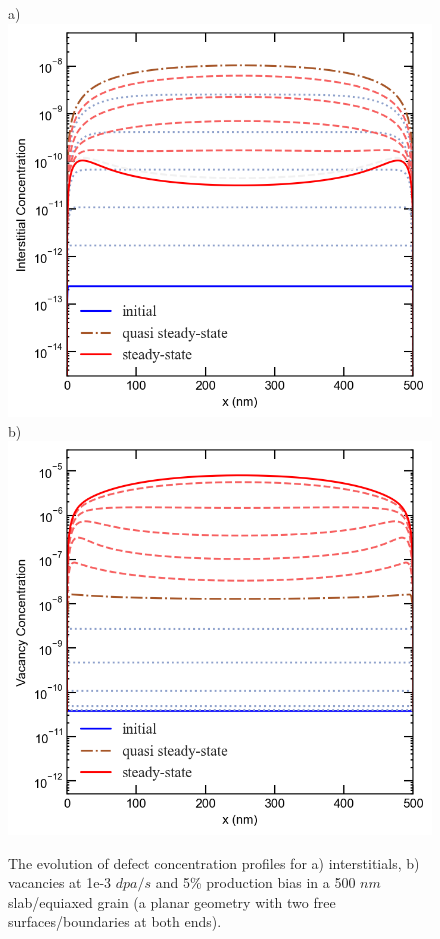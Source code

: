 \documentclass[utf8]{frontiersSCNS} %
\begin{document}
    \begin{figure}[h!]
        \centering
        a)\includegraphics[scale=0.55]{Fig3_a}
        b)\includegraphics[scale=0.55]{Fig3_b}
        \caption{The evolution of defect concentration profiles for a) interstitials, b) vacancies at 1e-3 $dpa/s$ and 5\% production bias in a 500 $nm$ slab/equiaxed grain (a planar geometry with two free surfaces/boundaries at both ends).}
        \label{figure:time_evolution_5_1e-3_500nm}
    \end{figure}
    
\end{document}
